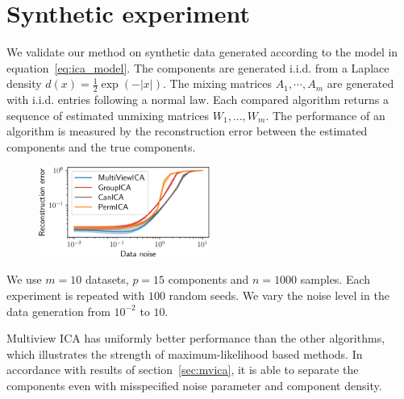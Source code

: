 \section{Synthetic experiment}

We validate our method on synthetic data generated according to the model in equation~\eqref{eq:ica_model}.
%
The components are generated i.i.d. from a Laplace density $d(x)=\frac12\exp(-|x|)$.
%
The mixing matrices $A_1,\cdots, A_m$ are generated with i.i.d. entries following a normal law.
Each compared algorithm returns a sequence of estimated unmixing matrices $W_1, \dots, W_m$.
%
The performance of an algorithm is measured by the reconstruction error between the estimated components and the true components.

\begin{figure}
  \label{fig:synth}
  \includegraphics[width=0.5\textwidth]{figures/mvica/distance_expe.pdf}
\end{figure}

%
%
We use $m=10$ datasets, $p=15$ components and $n=1000$ samples. Each experiment is repeated with $100$ random seeds.
%
We vary the noise level in the data generation from $10^{-2}$ to $10$.

Multiview ICA has uniformly better performance than the other algorithms, which illustrates the strength of maximum-likelihood based methods. In accordance with results of section~\ref{sec:mvica}, it is able to separate the components even with misspecified noise parameter and component density.
%

